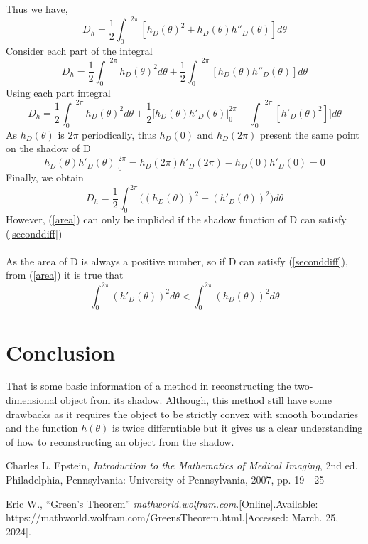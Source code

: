 \documentclass[a4paper]{article}
\begin{document}
Thus we have,
\begin{equation*}
    D_h = \frac{1}{2} {\int_0}^{2\pi} \left[h_D(\theta)^2 + h_D(\theta)h''_D(\theta)\right] d\theta
\end{equation*}
Consider each part of the integral
\begin{equation*}
    D_h = \frac{1}{2} {\int_0}^{2\pi} h_D(\theta)^2 d\theta + \frac{1}{2} {\int_0}^{2\pi} \left[ h_D(\theta)h''_D(\theta)\right] d\theta
\end{equation*}
Using each part integral
\begin{equation*}
    D_h = \frac{1}{2} {\int_0}^{2\pi} h_D(\theta)^2 d\theta + \frac{1}{2} \bigg[ h_D(\theta)h'_D(\theta)\Big|_0^{2\pi} - {\int_0}^{2\pi} \left[ h'_D(\theta)^2\right]\bigg] d\theta
\end{equation*}
As $h_D(\theta)$ is $2\pi$ periodically, thus $h_D(0)$ and $h_D(2\pi)$ present the same point on the shadow of D
\begin{equation*}
    h_D(\theta)h'_D(\theta)\Big|_0^{2\pi} = h_D(2\pi)h'_D(2\pi) - h_D(0)h'_D(0) = 0
\end{equation*}
Finally, we obtain
\begin{equation}\label{area}
    D_h = \frac{1}{2} \int_0^{2\pi} \big((h_D(\theta))^2 - (h'_D(\theta))^2\big) d\theta
\end{equation}
However, (\ref{area}) can only be implided if the shadow function of D can satisfy (\ref{seconddiff})\\ \\
As the area of D is always a positive number, so if D can satisfy (\ref{seconddiff}), from (\ref{area}) it is true that
\begin{equation*}
    \int_0^{2\pi} (h'_D(\theta))^2 d\theta < \int_0^{2\pi} (h_D(\theta))^2 d\theta
\end{equation*}
\section{Conclusion}
That is some basic information of a method in reconstructing the two-dimensional object from its shadow. Although, this method still have some drawbacks as it requires the object to be strictly convex with smooth boundaries and the function $h(\theta)$ is twice differntiable but it gives us a clear understanding of how to reconstructing an object from the shadow. 
\begin{thebibliography}{200}

    Charles L. Epstein,\textit{ Introduction to the Mathematics
    of Medical Imaging}, 2nd ed. Philadelphia, Pennsylvania: University of Pennsylvania, 2007, pp. 19 - 25

    Eric W., ``Green's Theorem'' \textit{mathworld.wolfram.com}.[Online].Available: https://mathworld.wolfram.com/GreensTheorem.html.[Accessed: March. 25, 2024].
\end{thebibliography}
\end{document}
